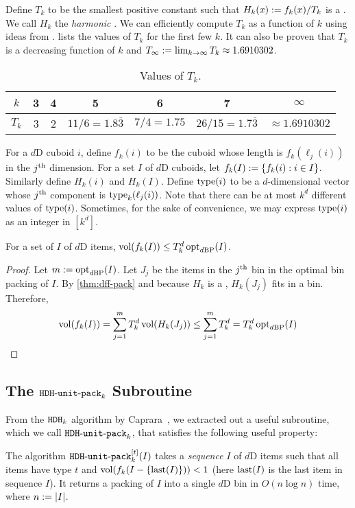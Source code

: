 Define $T_k$ to be the smallest positive constant such that
$H_k(x) := f_k(x)/T_k$ is a \dff{}. We call $H_k$ the \emph{harmonic \dff}.
We can efficiently compute $T_k$ as a function of $k$ using ideas from \cite{leelee,eku-harmonic}.
 lists the values of $T_k$ for the first few $k$.
It can also be proven that $T_k$ is a decreasing function of $k$
and $T_{\infty} := \lim_{k \to \infty} T_k \approx 1.6910302$.

\begin{table}[!ht]
\centering
\caption{Values of $T_k$.}
\begin{tabular}{|c|c|c|c|c|c|c|}
\hline
$k$ & 3 & 4 & 5 & 6 & 7 & $\infty$ \\
\hline
$T_k$ & 3 & 2 & $11/6 = 1.8\overline{3}$ & $7/4 = 1.75$
& $26/15 = 1.7\overline{3}$ & $\approx 1.6910302$ \\
\hline
\end{tabular}
\label{table:tk-values}
\end{table}

For a $d$D cuboid $i$, define $f_k(i)$ to be the cuboid
whose length is $f_k(\ell_j(i))$ in the $j^{\textrm{th}}$ dimension.
For a set $I$ of $d$D cuboids, let $f_k(I) := \{f_k(i): i \in I\}$.
Similarly define $H_k(i)$ and $H_k(I)$.
Define $\operatorname{type}(i)$ to be a $d$-dimensional vector whose $j^{\textrm{th}}$ component is $\operatorname{type}_k(\ell_j(i))$.
Note that there can be at most $k^d$ different values of $\operatorname{type}(i)$.
Sometimes, for the sake of convenience, we may express $\operatorname{type}(i)$ as an integer in $[k^d]$.

\begin{theorem}
\label{thm:fvol-bp}
For a set of $I$ of $d$D items, $\operatorname{vol}(f_k(I)) \le T_k^d \operatorname{opt}_{d\mathrm{BP}}(I)$.
\end{theorem}
\begin{proof}
Let $m := \operatorname{opt}_{d\mathrm{BP}}(I)$. Let $J_j$ be the items in the
$j^{\textrm{th}}$ bin in the optimal bin packing of $I$.
By \cref{thm:dff-pack} and because $H_k$ is a \dff{},
$H_k(J_j)$ fits in a bin. Therefore,
\[ \operatorname{vol}(f_k(I))
= \sum_{j=1}^m T_k^d \operatorname{vol}(H_k(J_j))
\le \sum_{j=1}^m T_k^d
= T_k^d \operatorname{opt}_{d\mathrm{BP}}(I)
\qedhere \]
\end{proof}

\subsection{The \texorpdfstring{$\operatorname{\mathtt{HDH-unit-pack}}_{k}$}{HDH-unit-pack} Subroutine}
\label{sec:hdhk-prelims:hdhkunit}

From the $\operatorname{\mathtt{HDH}}_{k}$ algorithm by Caprara~\cite{caprara2008},
we extracted out a useful subroutine, which we call $\operatorname{\mathtt{HDH-unit-pack}}_{k}$,
that satisfies the following useful property:
\begin{property}
\label{prop:hdhkunit}
The algorithm $\operatorname{\mathtt{HDH-unit-pack}}_{k}^{[t]}(I)$ takes a \emph{sequence} $I$ of $d$D items such that
all items have type $t$ and $\operatorname{vol}(f_k(I-\{\operatorname{last}(I)\})) < 1$
(here $\operatorname{last}(I)$ is the last item in sequence $I$).
It returns a packing of $I$ into a single $d$D bin
in $O(n\log n)$ time, where $n := |I|$.
\end{property}

